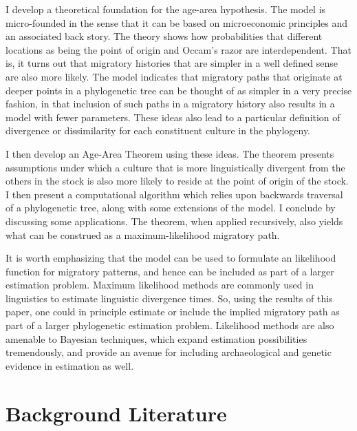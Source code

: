 \documentclass[11pt]{article}
\begin{document}
I develop a theoretical foundation for the age-area hypothesis. The model is micro-founded in the sense that it can be based on microeconomic principles and an associated back story. The theory shows how probabilities that different locations as being the point of origin and Occam's razor are interdependent. That is, it turns out that migratory histories that are simpler in a well defined sense are also more likely. The model indicates that migratory paths that originate at deeper points in a phylogenetic tree can be thought of as simpler in a very precise fashion, in that inclusion of such paths in a migratory history also results in a model with fewer parameters. These ideas also lead to a particular definition of divergence or dissimilarity for each constituent culture in the phylogeny. 

I then develop an Age-Area Theorem using these ideas. The theorem presents assumptions under which a culture that is more linguistically divergent from the others in the stock is also more likely to reside at the point of origin of the stock. I then present a computational algorithm which relies upon backwards traversal of a phylogenetic tree, along with some extensions of the model. I conclude by discussing some applications. The theorem, when applied recursively, also yields what can be construed as a maximum-likelihood migratory path. 

It is worth emphasizing that the model can be used to formulate an likelihood function for migratory patterns, and hence can be included as part of a larger estimation problem. Maximum likelihood methods are commonly used in linguistics to estimate linguistic divergence times. So, using the results of this paper, one could in principle estimate or include the implied migratory path as part of a larger phylogenetic estimation problem. Likelihood methods are also amenable to Bayesian techniques, which expand estimation possibilities tremendously, and provide an avenue for including archaeological and genetic evidence in estimation as well. 

\section{Background Literature}
\end{document}
